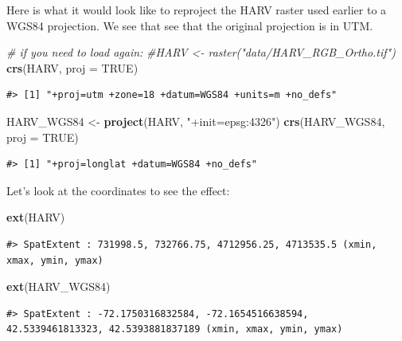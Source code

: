 \documentclass[
]{book}
\newenvironment{Shaded}{\begin{snugshade}}{\end{snugshade}}
\newcommand{\AttributeTok}[1]{\textcolor[rgb]{0.13,0.29,0.53}{#1}}
\newcommand{\CommentTok}[1]{\textcolor[rgb]{0.56,0.35,0.01}{\textit{#1}}}
\newcommand{\ConstantTok}[1]{\textcolor[rgb]{0.56,0.35,0.01}{#1}}
\newcommand{\FunctionTok}[1]{\textcolor[rgb]{0.13,0.29,0.53}{\textbf{#1}}}
\newcommand{\NormalTok}[1]{#1}
\newcommand{\OtherTok}[1]{\textcolor[rgb]{0.56,0.35,0.01}{#1}}
\newcommand{\StringTok}[1]{\textcolor[rgb]{0.31,0.60,0.02}{#1}}
\begin{document}
Here is what it would look like to reproject the HARV raster used earlier to a WGS84 projection. We see that see that the original projection is in UTM.

\begin{Shaded}
\begin{Highlighting}[]
\CommentTok{\# if you need to load again:}
\CommentTok{\#HARV \textless{}{-} raster("data/HARV\_RGB\_Ortho.tif")}
\FunctionTok{crs}\NormalTok{(HARV, }\AttributeTok{proj =} \ConstantTok{TRUE}\NormalTok{)}
\end{Highlighting}
\end{Shaded}

\begin{verbatim}
#> [1] "+proj=utm +zone=18 +datum=WGS84 +units=m +no_defs"
\end{verbatim}

\begin{Shaded}
\begin{Highlighting}[]
\NormalTok{HARV\_WGS84 }\OtherTok{\textless{}{-}} \FunctionTok{project}\NormalTok{(HARV, }\StringTok{"+init=epsg:4326"}\NormalTok{)}
\FunctionTok{crs}\NormalTok{(HARV\_WGS84, }\AttributeTok{proj =} \ConstantTok{TRUE}\NormalTok{)}
\end{Highlighting}
\end{Shaded}

\begin{verbatim}
#> [1] "+proj=longlat +datum=WGS84 +no_defs"
\end{verbatim}

Let's look at the coordinates to see the effect:

\begin{Shaded}
\begin{Highlighting}[]
\FunctionTok{ext}\NormalTok{(HARV)}
\end{Highlighting}
\end{Shaded}

\begin{verbatim}
#> SpatExtent : 731998.5, 732766.75, 4712956.25, 4713535.5 (xmin, xmax, ymin, ymax)
\end{verbatim}

\begin{Shaded}
\begin{Highlighting}[]
\FunctionTok{ext}\NormalTok{(HARV\_WGS84)}
\end{Highlighting}
\end{Shaded}

\begin{verbatim}
#> SpatExtent : -72.1750316832584, -72.1654516638594, 42.5339461813323, 42.5393881837189 (xmin, xmax, ymin, ymax)
\end{verbatim}
\end{document}

